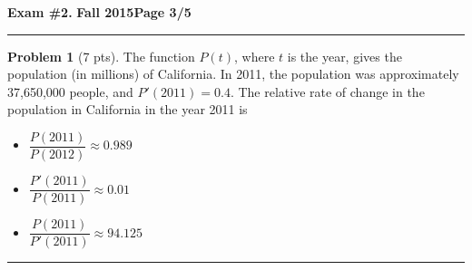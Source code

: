 \documentclass[12pt]{article}
\makeatletter
\theoremstyle{definition}
\newtheorem{problem}{Problem}
\newcommand*{\radiobutton}{%
  \@ifstar{\@radiobutton0}{\@radiobutton1}%
}
\newcommand*{\@radiobutton}[1]{%
  \begin{tikzpicture}
    \pgfmathsetlengthmacro\radius{height("X")/2}
    \draw[radius=\radius] circle;
    \ifcase#1 \fill[radius=.6*\radius] circle;\fi
  \end{tikzpicture}%
}
\makeatother
\begin{document}
\hfill{\large\bf Exam \#2.}\hfill{\large\bf
  Fall 2015}\hfill{\large\bf Page 3/5}\hrule

\bigskip
\begin{problem}[7 pts]
The function $P(t)$, where $t$ is the year, gives the population (in millions) of California. In 2011, the population was approximately 37,650,000 people, and $P'(2011) = 0.4$.  The relative rate of change in the population in California in the year 2011 is
\begin{itemize}
\item[\radiobutton] $\dfrac{P(2011)}{P(2012)} \approx 0.989$
\item[\radiobutton] $\dfrac{P'(2011)}{P(2011)} \approx 0.01$
\item[\radiobutton] $\dfrac{P(2011)}{P'(2011)} \approx 94.125$
\end{itemize}
\end{problem}
\hrule
\end{document}
